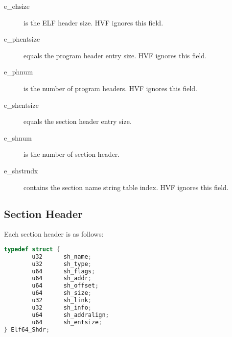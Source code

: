 \begin{description}
\item[e\_ehsize] is the ELF header size.  HVF ignores this field.

\item[e\_phentsize] equals the program header entry size.  HVF ignores this
	field.

\item[e\_phnum] is the number of program headers.  HVF ignores this field.

\item[e\_shentsize] equals the section header entry size.

\item[e\_shnum] is the number of section header.

\item[e\_shstrndx] contains the section name string table index.  HVF
	ignores this field.
\end{description}

\cbstart
\subsection{Section Header}
Each section header is as follows:

\begin{lstlisting}[language=C]
typedef struct {
        u32      sh_name;
        u32      sh_type;
        u64      sh_flags;
        u64      sh_addr;
        u64      sh_offset;
        u64      sh_size;
        u32      sh_link;
        u32      sh_info;
        u64      sh_addralign;
        u64      sh_entsize;
} Elf64_Shdr;
\end{lstlisting}

